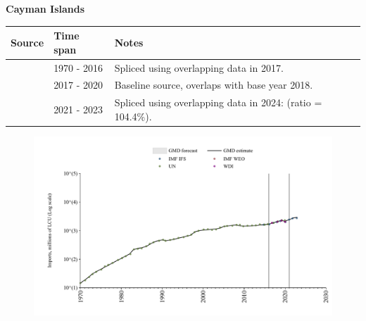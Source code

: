 \documentclass[12pt,a4paper,landscape]{article}
\begin{document}
\begin{adjustbox}{max totalsize={\paperwidth}{\paperheight},center}
\begin{minipage}[t][\textheight][t]{\textwidth}
\vspace*{0.5cm}
{}
\begin{center}
{\Large\bfseries Cayman Islands}
\end{center}
\vspace{0.5cm}
\begin{table}[H]
\centering
\small
\begin{tabular}{|l|l|l|}
\hline
\textbf{Source} & \textbf{Time span} & \textbf{Notes} \\
\hline
\rowcolor{white}\cite{UN}& 1970 - 2016 &Spliced using overlapping data in 2017.\\
\rowcolor{lightgray}\cite{WDI}& 2017 - 2020 &Baseline source, overlaps with base year 2018.\\
\rowcolor{white}\cite{IMF_IFS}& 2021 - 2023 &Spliced using overlapping data in 2024: (ratio = 104.4\%).\\
\hline
\end{tabular}
\end{table}
\begin{figure}[H]
\centering
\includegraphics[width=\textwidth,height=0.6\textheight,keepaspectratio]{graphs/CYM_imports.pdf}
\end{figure}
\end{minipage}
\end{adjustbox}
\end{document}
